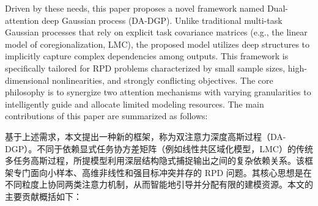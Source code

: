 \documentclass[11pt]{article}
\begin{document}
Driven by these needs, this paper proposes a novel framework named Dual-attention deep Gaussian process (DA-DGP). Unlike traditional multi-task Gaussian processes that rely on explicit task covariance matrices (e.g., the linear model of coregionalization, LMC), the proposed model utilizes deep structures to implicitly capture complex dependencies among outputs. This framework is specifically tailored for RPD problems characterized by small sample sizes, high-dimensional nonlinearities, and strongly conflicting objectives. The core philosophy is to synergize two attention mechanisms with varying granularities to intelligently guide and allocate limited modeling resources. The main contributions of this paper are summarized as follows:

基于上述需求，本文提出一种新的框架，称为双注意力深度高斯过程（DA-DGP）。不同于依赖显式任务协方差矩阵（例如线性共区域化模型，LMC）的传统多任务高斯过程，所提模型利用深层结构隐式捕捉输出之间的复杂依赖关系。该框架专门面向小样本、高维非线性和强目标冲突并存的 RPD 问题。其核心思想是在不同粒度上协同两类注意力机制，从而智能地引导并分配有限的建模资源。本文的主要贡献概括如下：
\end{document}
